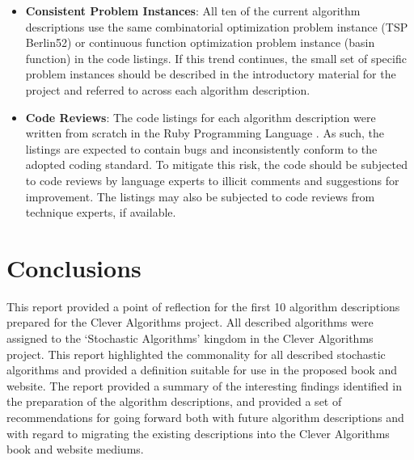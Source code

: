 \documentclass[a4paper, 11pt]{article}
\begin{document}
\begin{itemize}
	\item \textbf{Consistent Problem Instances}: All ten of the current algorithm descriptions use the same combinatorial optimization problem instance (TSP Berlin52) or continuous function optimization problem instance (basin function) in the code listings. If this trend continues, the small set of specific problem instances should be described in the introductory material for the project and referred to across each algorithm description.
	\item \textbf{Code Reviews}: The code listings for each algorithm description were written from scratch in the Ruby Programming Language \cite{Brownlee2010o}. As such, the listings are expected to contain bugs and inconsistently conform to the adopted coding standard. To mitigate this risk, the code should be subjected to code reviews by language experts to illicit comments and suggestions for improvement. The listings may also be subjected to code reviews from technique experts, if available.
\end{itemize}

% 
% 
\section{Conclusions}
\label{sec:conclusions}
This report provided a point of reflection for the first 10 algorithm descriptions prepared for the Clever Algorithms project. All described algorithms were assigned to the `Stochastic Algorithms' kingdom in the Clever Algorithms project. This report highlighted the commonality for all described stochastic algorithms and provided a definition suitable for use in the proposed book and website.
The report provided a summary of the interesting findings identified in the preparation of the algorithm descriptions, and provided a set of recommendations for going forward both with future algorithm descriptions and with regard to migrating the existing descriptions into the Clever Algorithms book and website mediums.



\end{document}
